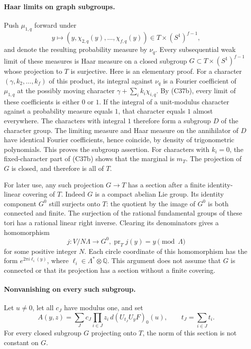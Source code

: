 \documentclass[11pt]{article}
\newcommand{\Q}{\mathbb Q}\newcommand{\C}{\mathbb C}\newcommand{\Z}{\mathbb Z}\newcommand{\R}{\mathbb R}\newcommand{\A}{\mathbb A}\newcommand{\OO}{\mathcal O}
\theoremstyle{definition}\newtheorem{definition}[theorem]{Definition}\newtheorem{remark}[theorem]{Remark}
\begin{document}
\paragraph{Haar limits on graph subgroups.}
Push $\mu_{1,q}$ forward under
\[
       y\longmapsto(y,\chi_{2,q}(y),\ldots,\chi_{f,q}(y))
          \in T\times(S^1)^{f-1},
\]
and denote the resulting probability measure by $\nu_q$.
Every subsequential weak limit of these measures is Haar measure
on a closed subgroup $G\subset T\times(S^1)^{f-1}$ whose
projection to $T$ is surjective.  Here is an elementary proof.
For a character $(\gamma,k_2,\ldots,k_f)$ of this product, its
integral against $\nu_q$ is a Fourier coefficient of $\mu_{1,q}$
at the possibly moving character
$\gamma+\sum_i k_i\chi_{i,q}$.  By (C37b), every limit of these
coefficients is either $0$ or $1$.  If the integral of a
unit-modulus character against a probability measure equals $1$,
that character equals $1$ almost everywhere.  The characters with
integral $1$ therefore form a subgroup $D$ of the character group.
The limiting measure and Haar measure on the annihilator of $D$
have identical Fourier coefficients, hence coincide, by density
of trigonometric polynomials.  This proves the subgroup assertion.
For characters with $k_i=0$, the fixed-character part of (C37b)
shows that the marginal is $m_T$.  The projection of $G$ is
closed, and therefore is all of $T$.

For later use, any such projection $G\to T$ has a section after
a finite identity-linear covering of $T$.  Indeed $G$ is a
compact abelian Lie group.  Its identity component $G^0$ still
surjects onto $T$: the quotient by the image of $G^0$ is both
connected and finite.  The surjection of the rational fundamental
groups of these tori has a rational linear right inverse.
Clearing its denominators gives a homomorphism
\[
 j:V/N\Lambda\longrightarrow G^0,
       \operatorname{pr}_Tj(y)=y\pmod\Lambda
 \tag{C37k}
\]
for some positive integer $N$.  Each circle coordinate of this
homomorphism has the form $e^{2\pi i\ell_i(y)}$, where
$\ell_i\in\Lambda^*\otimes\Q$.  This argument does not assume
that $G$ is connected or that its projection has a section
without a finite covering.

\paragraph{Nonvanishing on every such subgroup.}
Let $u\ne0$, let all $c_J$ have modulus one, and set
\[
 A(y,z)=\sum_J c_J\prod_{i\in J}z_i\,
                       d(U_{t_J}U_yF)_0(u),
       \qquad t_J=\sum_{i\in J}t_i.
 \tag{C37l}
\]
For every closed subgroup $G$ projecting onto $T$, the norm of
this section is not constant on $G$.
\end{document}
